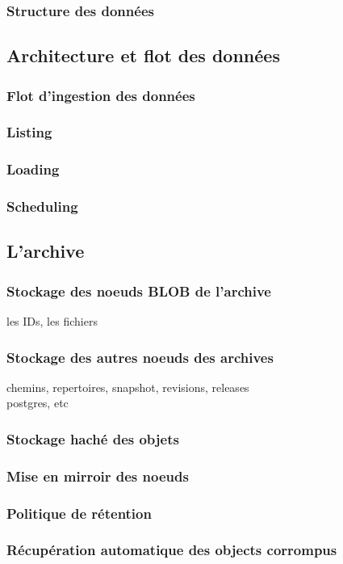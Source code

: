 \documentclass[12pt,a4paper]{report}
\begin{document}
		\subsubsection{Structure des données}
	\subsection{Architecture et flot des données}
		\subsubsection{Flot d'ingestion des données}
		\subsubsection{Listing}
		\subsubsection{Loading}
		\subsubsection{Scheduling}
	\subsection{L'archive}
		\subsubsection{Stockage des noeuds BLOB de l'archive}
				les IDs, les fichiers
		\subsubsection{Stockage des autres noeuds des archives}
				chemins, repertoires, snapshot, revisions, releases\\				
				postgres, etc
		\subsubsection{Stockage haché des objets}
		\subsubsection{Mise en mirroir des noeuds}
		\subsubsection{Politique de rétention}
		\subsubsection{Récupération automatique des objects corrompus}
\end{document}
